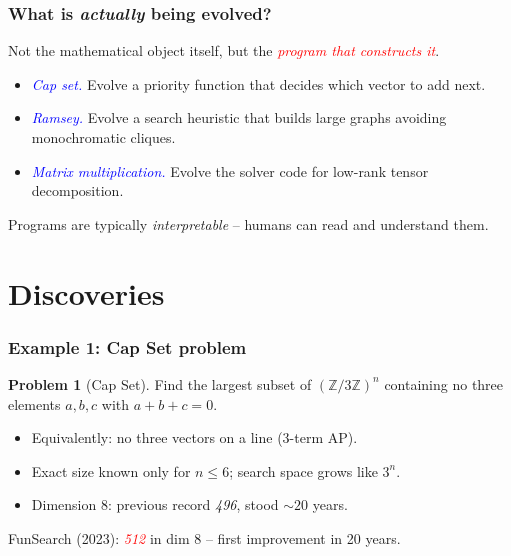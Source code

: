 \documentclass{beamer}
\theoremstyle{definition}
\newtheorem{prob}[thm]{Problem}
\newcommand\ZZ{\mathbb{Z}}
\newcommand\remph[1]{\emph{\textcolor{red}{#1}}}
\newcommand\bemph[1]{\emph{\textcolor{blue}{#1}}}
\begin{document}
\begin{frame}
  \frametitle{What is \emph{actually} being evolved?}
  \pause
  Not the mathematical object itself, but the \remph{program that constructs it}.
  \pause
  \vspace{.3cm}

  \begin{itemize}
    \item[$\bullet$] \bemph{Cap set.} Evolve a priority function that decides
      which vector to add next.
      \pause
    \item[$\bullet$] \bemph{Ramsey.} Evolve a search heuristic that builds
      large graphs avoiding monochromatic cliques.
      \pause
    \item[$\bullet$] \bemph{Matrix multiplication.} Evolve the solver code for
      low-rank tensor decomposition.
  \end{itemize}
  \pause
  \vspace{.3cm}

  Programs are typically \emph{interpretable} -- humans can read and
  understand them.
\end{frame}


\section{Discoveries}


\begin{frame}
  \frametitle{Example 1: Cap Set problem}
  \begin{prob}[Cap Set]
    Find the largest subset of \( (\ZZ/3\ZZ)^n \) containing no three
    elements \( a, b, c \) with \( a + b + c = 0 \).
  \end{prob}
  \pause
  \vspace{.2cm}

  \begin{itemize}
    \item[$\bullet$] Equivalently: no three vectors on a line (3-term AP). \pause
    \item[$\bullet$] Exact size known only for \( n \le 6 \); search space
      grows like \( 3^n \). \pause
    \item[$\bullet$] Dimension 8: previous record \emph{496}, stood
      $\sim 20$ years.
  \end{itemize}
  \pause
  \vspace{.25cm}

  \begin{center}
    FunSearch (2023): \remph{512} in dim 8 -- first improvement in 20 years.
  \end{center}
\end{frame}
\end{document}
